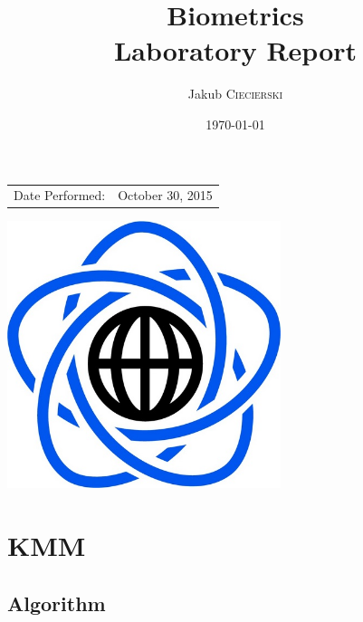 \documentclass{article}
\title{Biometrics \\ Laboratory Report} %
\author{Jakub \textsc{Ciecierski}} %
\date{\today} %
\begin{document}
\maketitle %

\begin{center}
\begin{tabular}{l r}
Date Performed: & October 30, 2015 \\ %
\end{tabular}

\vspace{60pt}
\includegraphics[width=80mm]{res/mini.PNG} \\
\end{center}


\newpage

	\tableofcontents
	
\newpage

\section{KMM}

\subsection{Algorithm}
\end{document}
